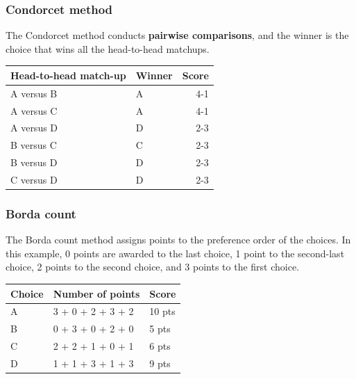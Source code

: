 \documentclass[11pt]{article}
\begin{document}
\subsubsection{Condorcet method}
\label{sec:org3d9ab8d}
The Condorcet method conducts \textbf{pairwise comparisons}, and the winner is the choice that wins all the head-to-head matchups.
\begin{center}
\begin{tabular}{l|l|r}
Head-to-head match-up & Winner & Score\\
\hline
A versus B & A & 4-1\\
A versus C & A & 4-1\\
A versus D & D & 2-3\\
B versus C & C & 2-3\\
B versus D & D & 2-3\\
C versus D & D & 2-3\\
\end{tabular}
\end{center}
\subsubsection{Borda count}
\label{sec:org06f64cf}
The Borda count method assigns points to the preference order of the choices. In this example, 0 points are awarded to the last choice, 1 point to the second-last choice, 2 points to the second choice, and 3 points to the first choice.
\begin{center}
\begin{tabular}{l|l|l}
Choice & Number of points & Score\\
\hline
A & 3 + 0 + 2 + 3 + 2 & 10 pts\\
B & 0 + 3 + 0 + 2 + 0 & 5 pts\\
C & 2 + 2 + 1 + 0 + 1 & 6 pts\\
D & 1 + 1 + 3 + 1 + 3 & 9 pts\\
\end{tabular}
\end{center}

 \newpage
\end{document}
